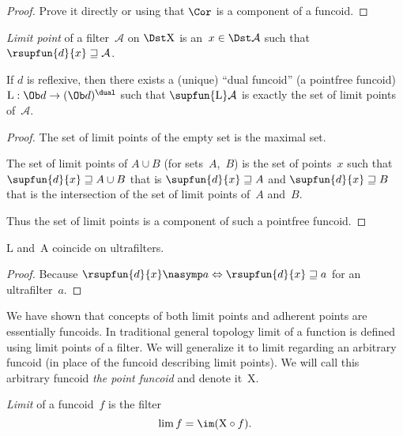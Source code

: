 \begin{proof}
Prove it directly or using that $\Cor$ is a component of a funcoid.
\end{proof}

\begin{defn}
\emph{Limit point} of a filter~$\mathcal{A}$ on $\Dst\mathrm{X}$ is
an~$x\in\Dst\mathcal{A}$ such that
$\rsupfun{d}\{x\}\sqsupseteq\mathcal{A}$.
\end{defn}

\begin{prop}
If $d$ is reflexive, then
there exists a (unique) ``dual funcoid'' (a pointfree funcoid) $\mathrm{L}: \Ob d\to(\Ob d)^{\dual}$ such that
$\supfun{\mathrm{L}}\mathcal{A}$ is exactly the set of limit points of~$\mathcal{A}$.
\end{prop}

\begin{proof}
The set of limit points of the empty set is the maximal set.

The set of limit points of $A\cup B$ (for sets~$A$,~$B$) is the
set of points~$x$ such that $\supfun{d}\{x\}\sqsupseteq A\cup B$ that is $\supfun{d}\{x\}\sqsupseteq A$ and $\supfun{d}\{x\}\sqsupseteq B$ that is the intersection of
the set of limit points of~$A$ and~$B$.

Thus the set of limit points is a component of such a pointfree funcoid.
\end{proof}

\begin{prop}
$\mathrm{L}$ and~$\mathrm{A}$ coincide on ultrafilters.
\end{prop}

\begin{proof}
Because $\rsupfun{d}\{x\}\nasymp a\Leftrightarrow\rsupfun{d}\{x\}\sqsupseteq a$ for an ultrafilter~$a$.
\end{proof}

We have shown that concepts of both limit points and adherent points are essentially funcoids. In traditional general topology limit of a function is defined using limit points of a filter. We will generalize it to limit regarding an arbitrary funcoid (in place of the funcoid describing limit points). We will call this
arbitrary funcoid \emph{the point funcoid} and denote it~$\mathrm{X}$.

\begin{defn}
\emph{Limit} of a funcoid~$f$ is
the filter \[ \lim f=\im(\mathrm{X}\circ f). \]
\end{defn}

